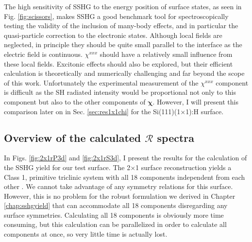 The high sensitivity of SSHG to the energy position of surface states, as seen
in Fig. \ref{fig:scissors}, makes SSHG a good benchmark tool for
spectroscopically testing the validity of the inclusion of many-body effects,
and in particular the quasi-particle correction to the electronic states.
Although local fields are neglected, in principle they should be quite small
parallel to the interface as the electric field is continuous. $\chi^{xxx}$
should have a relatively small influence from these local fields. Excitonic
effects should also be explored, but their efficient calculation is
theoretically and numerically challenging \cite{beyond} and far beyond the scope
of this work. Unfortunately the experimental measurement of the $\chi^{xxx}$
component is difficult as the SH radiated intensity would be proportional not
only to this component but also to the other components of $\boldsymbol{\chi}$.
However, I will present this comparison later on in Sec. \ref{sec:res1x1chi} for
the Si(111)(1$\times$1):H surface.



\subsection{Overview of the calculated \texorpdfstring{$\mathcal{R}$}{R}
spectra}\label{sec:2x1R3D}

In Figs. \ref{fig:2x1rP3d} and \ref{fig:2x1rS3d}, I present the results for the
calculation of the SSHG yield for our test surface. The 2$\times$1 surface
reconstruction yields a Class 1, primitive triclinic system with all 18
components independent from each other \cite{popovbook}. We cannot take
advantage of any symmetry relations for this surface. However, this is no
problem for the robust formulation we derived in Chapter \ref{chap:sshgyield}
that can accommodate all 18 components disregarding any surface symmetries.
Calculating all 18 components is obviously more time consuming, but this
calculation can be parallelized in order to calculate all components at once, so
very little time is actually lost.

